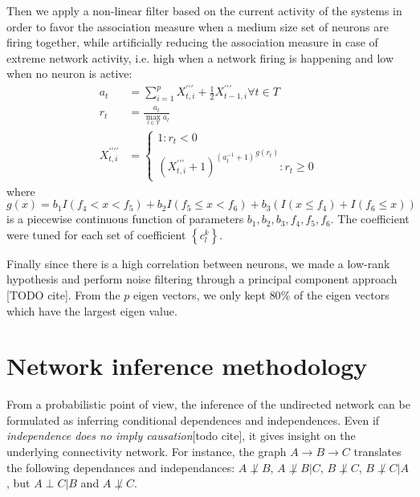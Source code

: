 \documentclass[wcp]{jmlr}
\begin{document}
Then we apply a non-linear filter based on the current
activity of the systems in order to favor the association measure when
a medium size set of neurons are firing together, while artificially
reducing the association measure in case of extreme network activity,
i.e. high when a network firing is happening and low when no neuron is
active:
\begin{align}
a_t &= \sum_{i=1}^p X^{\prime\prime\prime}_{t,i} +
                   \frac{1}{2} X^{\prime\prime\prime}_{t-1,i} \forall t \in T\\
r_t &= \frac{a_t}{\max_{l \in T}{a_l}} \\
X^{\prime\prime\prime\prime}_{t,i} &=
\left\{
  \begin{array}{l}
    1  : r_t < 0\\
    {(X^{\prime\prime\prime}_{t,i} + 1)^{(a_t^{-1} + 1)}}^{g(r_t)} : r_t \geq 0
  \end{array}
\right.
\end{align}
where $g(x) = b_1 I(f_4 < x < f_5) + b_2  I(f_5 \leq x < f_6) +
b_3 (I(x\leq f_4) + I(f_ 6 \leq x))$ is a piecewise continuous function of
parameters $b_1, b_2, b_3, f_4, f_5, f_6$. The coefficient were tuned
for each set of coefficient $\left\{c_l^k\right\}$.

Finally since there is a high correlation between neurons, we made a
low-rank hypothesis and perform noise filtering through a principal component
approach [TODO cite]. From the $p$ eigen vectors, we only kept $80\%$ of
the eigen vectors which have the largest eigen value.

\section{Network inference methodology}
\label{sec:inference}

From a probabilistic point of view, the inference of the undirected network
can be formulated as inferring conditional dependences and
independences.  Even if \textit{independence
does no imply causation}[todo cite], it gives insight on the underlying connectivity
network. For instance, the graph $A \rightarrow B \rightarrow C$ translates the
following dependances and independances: $A \not\perp B$, $A \not\perp B | C$,
$B \not\perp C$, $B \not\perp C | A$, but $A \perp C | B$ and  $A \not\perp C$.
\end{document}
